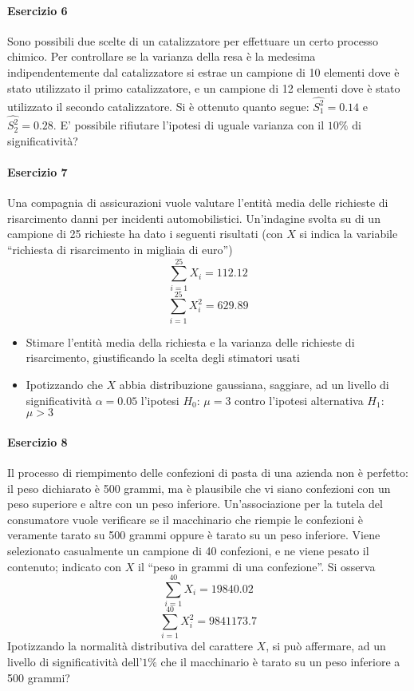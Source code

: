 \documentclass[12pt]{article}
\begin{document}
    \paragraph{Esercizio 6}
    Sono possibili due scelte di un catalizzatore per effettuare un certo processo chimico. Per controllare se la varianza della resa è la medesima indipendentemente dal catalizzatore si estrae un campione di 10 elementi dove è stato utilizzato il primo catalizzatore, e un campione di 12 elementi dove è stato utilizzato il secondo catalizzatore. Si è ottenuto quanto segue: $\hat{S^2_1} = 0.14$ e $\hat{S^2_2} = 0.28$.
    E’ possibile rifiutare l’ipotesi di uguale varianza con il $10\%$ di significatività?
    \paragraph{Esercizio 7}
    Una compagnia di assicurazioni vuole valutare l’entità media delle richieste di risarcimento danni per incidenti automobilistici. Un’indagine svolta su di un campione di 25 richieste ha dato i seguenti risultati (con $X$ si indica la variabile “richiesta di risarcimento in migliaia di euro”)
    $$\sum_{i=1}^{25}{X_i} =  112.12$$
    $$\sum_{i=1}^{25}{X_i^2} =  629.89$$
    \begin{itemize}
        \item Stimare l’entità media della richiesta e la varianza delle richieste di risarcimento, giustificando la scelta degli stimatori usati
        \item Ipotizzando che $X$ abbia distribuzione gaussiana, saggiare, ad un livello di significatività $\alpha = 0.05$ l’ipotesi $H_0$: $\mu=3$ contro l’ipotesi alternativa $H_1$: $\mu>3$
    \end{itemize}
    \newpage
    \paragraph{Esercizio 8}
    Il processo di riempimento delle confezioni di pasta di una azienda non è perfetto: il peso dichiarato è 500 grammi, ma è plausibile che vi siano confezioni con un peso superiore e altre con un peso inferiore. Un’associazione per la tutela del consumatore vuole verificare se il macchinario che riempie le confezioni è veramente tarato su 500 grammi oppure è tarato su un peso inferiore. Viene selezionato casualmente un campione di 40 confezioni, e ne viene pesato il contenuto; indicato con $X$ il “peso in grammi di una confezione”. Si osserva
    $$\sum_{i=1}^{40}{X_i} =  19840.02$$
    $$\sum_{i=1}^{40}{X_i^2} =  9841173.7$$
    Ipotizzando la normalità distributiva del carattere $X$, si può affermare, ad un livello di significatività dell’$1\%$ che il macchinario è tarato su un peso inferiore a 500 grammi?
\end{document}
